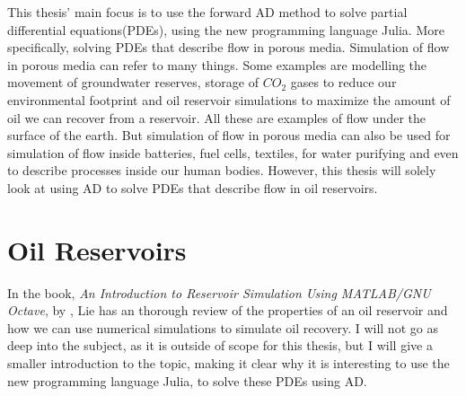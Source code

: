 This thesis' main focus is to use the forward AD method to solve partial differential equations(PDEs), using the new programming language Julia. More specifically, solving PDEs that describe flow in porous media. Simulation of flow in porous media can refer to many things. Some examples are modelling the movement of groundwater reserves, storage of $CO_2$ gases to reduce our environmental footprint and oil reservoir simulations to maximize the amount of oil we can recover from a reservoir. All these are examples of flow under the surface of the earth. But simulation of flow in porous media can also be used for simulation of flow inside batteries, fuel cells, textiles, for water purifying and even to describe processes inside our human bodies. However, this thesis will solely look at using AD to solve PDEs that describe flow in oil reservoirs.

\section{Oil Reservoirs}
In the book, \textit{An Introduction to Reservoir Simulation Using MATLAB/GNU Octave}, by \emph{\citet{lieMrstUrl}}, Lie has an thorough review of the properties of an oil reservoir and how we can use numerical simulations to simulate oil recovery. I will not go as deep into the subject, as it is outside of scope for this thesis, but I will give a smaller introduction to the topic, making it clear why it is interesting to use the new programming language Julia, to solve these PDEs using AD.

